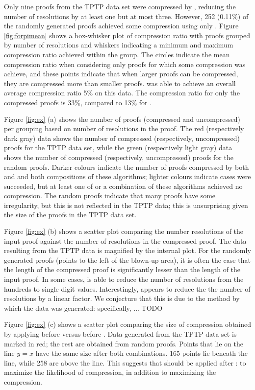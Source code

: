 {Only nine proofs from the TPTP data set were compressed by {\FORPI}, reducing the number of resolutions by at least one but at most three. However, 252 (0.11\%) of the randomly generated proofs achieved some compression using only {\FORPI}.
Figure \ref{fig:forpimean} shows a box-whisker plot of compression ratio with proofs grouped by number of resolutions and whiskers indicating a minimum and maximum compression ratio achieved within the group. The circles indicate the mean compression ratio when considering only proofs for which some compression was achieve, and these points indicate that when larger proofs can be compressed, they are compressed more than smaller proofs.
{\FORPI} was able to achieve an overall average compression ratio 5\% on this data. The compression ratio for only the compressed proofs is 33\%, compared to 13\% for {\GFOLU}.

Figure \ref{fig:ex} (a) shows the number of proofs (compressed and uncompressed) per grouping based on number of resolutions in the proof. The red (respectively dark gray) data shows the number of compressed (respectively, uncompressed) proofs for the TPTP data set, while the green (respectively light gray) data shows the number of compressed (respectively, uncompressed) proofs for the random proofs. Darker colours indicate the number of proofs compressed by both {\FORPI} and {\GFOLU} and both compositions of these algorithms; lighter colours indicate cases were {\FORPI} succeeded, but at least one of {\GFOLU} or a combination of these algorithms achieved no compression. The random proofs indicate that many proofs have some irregularity, but this is not reflected in the TPTP data; this is unsurprising given the size of the proofs in the TPTP data set.

Figure \ref{fig:ex} (b) shows a scatter plot comparing the number resolutions of the input proof against the number of resolutions in the compressed proof. The data resulting from the TPTP data is magnified by the internal plot. For the randomly generated proofs (points to the left of the blown-up area), it is often the case that the length of the compressed proof is significantly lesser than the length of the input proof. In some cases, {\FORPI} is able to reduce the number of resolutions from the hundreds to single digit values. Interestingly, {\GFOLU} appears to reduce the the number of resolutions by a linear factor. We conjecture that this is due to the method by which the data was generated: specifically, ... TODO

Figure \ref{fig:ex} (c) shows a scatter plot comparing the size of compression obtained by applying {\FORPI} before {\GFOLU} versus {\GFOLU} before {\FORPI}. Data generated from the TPTP data set is marked in red; the rest are obtained from random proofs. Points that lie on the line $y=x$ have the same size after both combinations. 165 points lie beneath the line, while 258 are above the line. This suggests that {\GFOLU} should be applied after {\FORPI}: to maximize the likelihood of compression, in addition to maximizing the compression.

}
